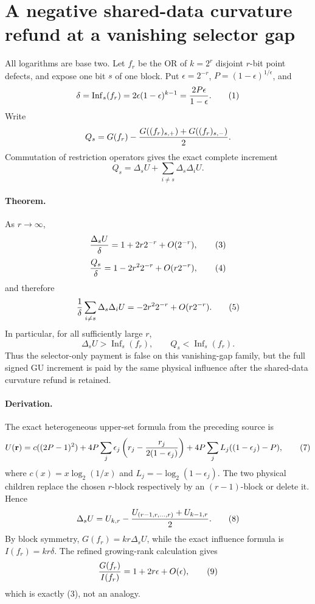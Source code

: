 \section*{A negative shared-data curvature refund at a vanishing selector gap}

All logarithms are base two.  Let $f_r$ be the OR of $k=2^r$ disjoint
$r$-bit point defects, and expose one bit $s$ of one block.  Put
$\epsilon=2^{-r}$, $P=(1-\epsilon)^{1/\epsilon}$, and
\[
 \delta=\operatorname{Inf}_s(f_r)
 =2\epsilon(1-\epsilon)^{k-1}={2P\epsilon\over1-\epsilon}. \tag{1}
\]
Write
\[
 Q_s=G(f_r)-{G((f_r)_{s,+})+G((f_r)_{s,-})\over2}.
\]
Commutation of restriction operators gives the exact complete increment
\[
 Q_s=\Delta_sU+\sum_{i\ne s}\Delta_s\Delta_iU.          \tag{2}
\]

\paragraph{Theorem.}
As $r\to\infty$,
\[
 {\Delta_sU\over\delta}=1+2r2^{-r}+O(2^{-r}),          \tag{3}
\]
\[
 {Q_s\over\delta}=1-2r^2 2^{-r}+O(r2^{-r}),            \tag{4}
\]
and therefore
\[
 {1\over\delta}\sum_{i\ne s}\Delta_s\Delta_iU
 =-2r^2 2^{-r}+O(r2^{-r}).                              \tag{5}
\]
In particular, for all sufficiently large $r$,
\[
 \Delta_sU>\operatorname{Inf}_s(f_r),\qquad
 Q_s<\operatorname{Inf}_s(f_r).                         \tag{6}
\]
Thus the selector-only payment is false on this vanishing-gap family, but
the full signed GU increment is paid by the same physical influence after
the shared-data curvature refund is retained.

\paragraph{Derivation.}
The exact heterogeneous upper-set formula from the preceding source is
\[
 U(\mathbf r)=c((2P-1)^2)+4P\sum_j\epsilon_j
 \left(r_j-{r_j\over2(1-\epsilon_j)}\right)
 +4P\sum_jL_j((1-\epsilon_j)-P),                        \tag{7}
\]
where $c(x)=x\log_2(1/x)$ and
$L_j=-\log_2(1-\epsilon_j)$.  The two physical children replace the
chosen $r$-block respectively by an $(r-1)$-block or delete it.  Hence
\[
 \Delta_sU=U_{k,r}-{U_{(r-1,r,\ldots,r)}+U_{k-1,r}\over2}. \tag{8}
\]
By block symmetry, $G(f_r)=kr\Delta_sU$, while the exact influence formula
is $I(f_r)=kr\delta$.  The refined growing-rank calculation gives
\[
 {G(f_r)\over I(f_r)}=1+2r\epsilon+O(\epsilon),         \tag{9}
\]
which is exactly (3), not an analogy.

